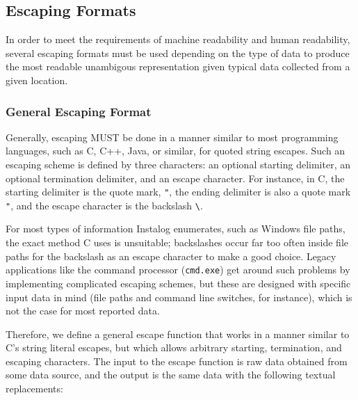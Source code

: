 \documentclass[letterpaper,12pt]{article}
\begin{document}
\subsection{Escaping Formats}
In order to meet the requirements of machine readability and human readability,
several escaping formats must be used depending on the type of data to produce
the most readable unambigous representation given typical data collected from a
given location.

\subsubsection{General Escaping Format}
Generally, escaping MUST be done in a manner similar to most programming
languages, such as C, C++, Java, or similar, for quoted string escapes. Such an
escaping scheme is defined by three characters: an optional starting delimiter,
an optional termination delimiter, and an escape character. For instance, in C,
the starting delimiter is the quote mark, \verb|"|, the ending delimiter is also a quote
mark \verb|"|, and the escape character is the backslash \verb|\|.

For most types of information Instalog enumerates, such as Windows file paths,
the exact method C uses is unsuitable; backslashes occur far too often inside
file paths for the backslash as an escape character to make a good choice.
Legacy applications like the command processor (\texttt{cmd.exe}) get around
such problems by implementing complicated escaping schemes, but these are
designed with specific input data in mind (file paths and command line
switches, for instance), which is not the case for most reported data.

\label{generalescape}
Therefore, we define a general escape function that works in a manner similar to
C's string literal escapes, but which allows arbitrary starting, termination,
and escaping characters. The input to the escape function is raw data obtained
from some data source, and the output is the same data with the following
textual replacements:
\end{document}
